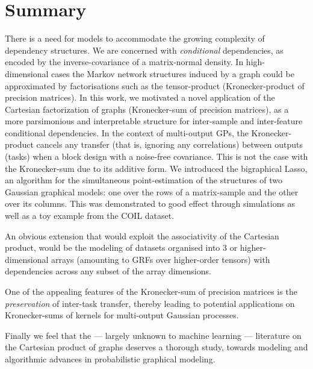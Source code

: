       
   
    
  \section{Summary} \label{sec:chap6_conclusion}
    
    
    There is a need for models to accommodate the growing complexity of dependency structures. 
    We are concerned with \emph{conditional} dependencies, as encoded by the inverse-covariance of a matrix-normal density.
    In high-dimensional cases the Markov network structures induced by a graph could be approximated by factorisations such as the tensor-product (Kronecker-product of precision matrices).
    In this work, we motivated a novel application of the Cartesian factorization of graphs (Kronecker-sum of precision matrices), as a more parsimonious and interpretable structure for inter-sample and inter-feature conditional dependencies.
    {\color{black} In the context of multi-output GPs, the Kronecker-product cancels any transfer (that is, ignoring any correlations) between outputs (tasks) when a block design with a noise-free covariance.}
    This is not the case with the Kronecker-sum due to its additive form.
    We introduced the bigraphical Lasso, an algorithm for the simultaneous point-estimation of the structures of two Gaussian graphical models: one over the rows of a matrix-sample and the other over its columns.
    This was demonstrated to good effect through simulations as well as a toy example from the COIL dataset.
    
    An obvious extension that would exploit the associativity of the Cartesian product, would be the modeling of datasets organised into 3 or higher-dimensional arrays {\color{black} (amounting to GRFs over higher-order tensors) with dependencies across any subset of the array dimensions.}
    
    One of the appealing features of the Kronecker-sum of precision matrices is the \emph{preservation} of inter-task transfer, thereby leading to potential applications on Kronecker-sums of kernels for multi-output Gaussian processes.
    
    Finally we feel that the --- largely unknown to machine learning --- literature on the Cartesian product of graphs deserves a thorough study, towards modeling and algorithmic advances in probabilistic graphical modeling.

